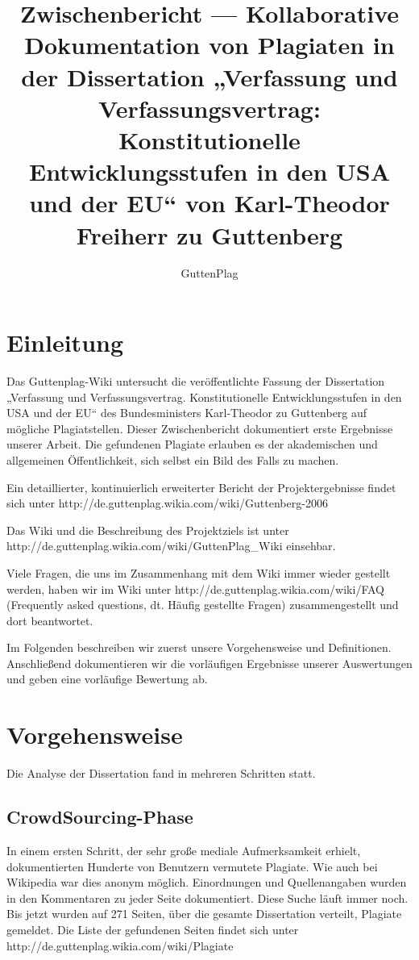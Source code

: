 \documentclass[ngerman,final,fontsize=12pt,paper=a4,twoside,BCOR=8mm,draft=false]{scrartcl}
\author{GuttenPlag}
\title{Zwischenbericht --- Kollaborative Dokumentation von Plagiaten in der Dissertation „Verfassung und Verfassungsvertrag: Konstitutionelle Entwicklungsstufen in den USA und der EU“ von Karl-Theodor Freiherr zu Guttenberg}
\begin{document}

\maketitle
\tableofcontents

\section{Einleitung}
Das Guttenplag-Wiki untersucht die veröffentlichte Fassung der Dissertation „Verfassung und Verfassungsvertrag. Konstitutionelle Entwicklungsstufen in den USA und der EU“ des Bundesministers Karl-Theodor zu Guttenberg auf mögliche Plagiatstellen.
Dieser Zwischenbericht dokumentiert erste Ergebnisse unserer Arbeit. Die gefundenen Plagiate erlauben es der akademischen und allgemeinen Öffentlichkeit, sich selbst ein Bild des Falls zu machen.

Ein detaillierter, kontinuierlich erweiterter Bericht der Projektergebnisse findet sich unter http://de.guttenplag.wikia.com/wiki/Guttenberg-2006

Das Wiki und die Beschreibung des Projektziels ist unter http://de.guttenplag.wikia.com/wiki/GuttenPlag\_Wiki einsehbar.

Viele Fragen, die uns im Zusammenhang mit dem Wiki immer wieder gestellt werden, haben wir im Wiki unter http://de.guttenplag.wikia.com/wiki/FAQ (Frequently asked questions, dt. Häufig gestellte Fragen) zusammengestellt und dort beantwortet.

Im Folgenden beschreiben wir zuerst unsere Vorgehensweise und Definitionen. Anschließend dokumentieren wir die vorläufigen Ergebnisse unserer Auswertungen und geben eine vorläufige Bewertung ab.

\section{Vorgehensweise}
Die Analyse der Dissertation fand in mehreren Schritten statt.
\subsection{CrowdSourcing-Phase}
In einem ersten Schritt, der sehr große mediale Aufmerksamkeit erhielt, dokumentierten Hunderte von Benutzern vermutete Plagiate. Wie auch bei Wikipedia war dies anonym möglich. Einordnungen und Quellenangaben wurden in den Kommentaren zu jeder Seite dokumentiert. Diese Suche läuft immer noch. Bis jetzt wurden auf 271 Seiten, über die gesamte Dissertation verteilt, Plagiate gemeldet. Die Liste der gefundenen Seiten findet sich unter http://de.guttenplag.wikia.com/wiki/Plagiate
\end{document}
